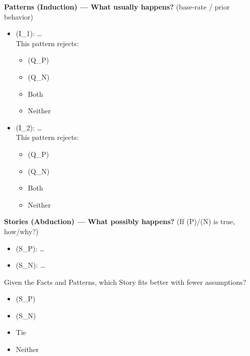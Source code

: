 \documentclass[
  letterpaper,
  DIV=11,
  numbers=noendperiod]{scrartcl}
\providecommand{\tightlist}{%
  \setlength{\itemsep}{0pt}\setlength{\parskip}{0pt}}
\begin{document}
\textbf{Patterns (Induction) --- What usually happens?} (base-rate /
prior behavior)

\begin{itemize}
\tightlist
\item
  (I\_1): \emph{\ldots{}}\\
  This pattern rejects:

  \begin{itemize}
  \tightlist
  \item[$\square$]
    (Q\_P)\\
  \item[$\square$]
    (Q\_N)\\
  \item[$\square$]
    Both\\
  \item[$\square$]
    Neither
  \end{itemize}
\item
  (I\_2): \emph{\ldots{}}\\
  This pattern rejects:

  \begin{itemize}
  \tightlist
  \item[$\square$]
    (Q\_P)\\
  \item[$\square$]
    (Q\_N)\\
  \item[$\square$]
    Both\\
  \item[$\square$]
    Neither
  \end{itemize}
\end{itemize}

\textbf{Stories (Abduction) --- What possibly happens?} (If (P)/(N) is
true, how/why?)

\begin{itemize}
\tightlist
\item
  (S\_P): \emph{\ldots{}}\\
\item
  (S\_N): \emph{\ldots{}}
\end{itemize}

Given the Facts and Patterns, which Story fits better with fewer
assumptions?

\begin{itemize}
\tightlist
\item[$\square$]
  (S\_P)
\item[$\square$]
  (S\_N)
\item[$\square$]
  Tie
\item[$\square$]
  Neither
\end{itemize}
\end{document}
